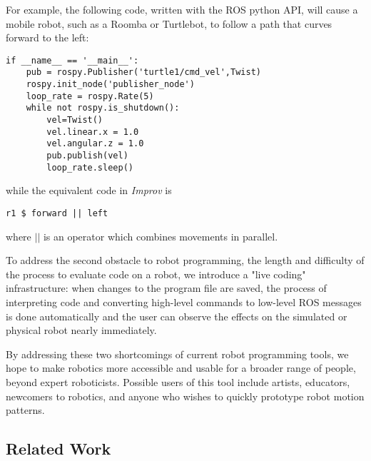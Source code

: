 \documentclass[sigconf]{acmart}
\begin{document}
For example, the following code, written with the ROS python API, will cause a
mobile robot, such as a Roomba or Turtlebot, to follow a path that curves
forward to the left:

\begin{verbatim}
if __name__ == '__main__':
    pub = rospy.Publisher('turtle1/cmd_vel',Twist)
    rospy.init_node('publisher_node')
    loop_rate = rospy.Rate(5)
    while not rospy.is_shutdown():
        vel=Twist()
        vel.linear.x = 1.0
        vel.angular.z = 1.0
        pub.publish(vel)
        loop_rate.sleep()
\end{verbatim}

while the equivalent code in \emph{Improv} is

\begin{verbatim}
r1 $ forward || left
\end{verbatim}

where $||$ is an operator which combines movements in parallel.

To address the second obstacle to robot programming, the length and difficulty
of the process to evaluate code on a robot, we introduce a "live coding"
infrastructure: when changes to the program file are saved, the process of
interpreting code and converting high-level commands to low-level ROS messages
is done automatically and the user can observe the effects on the simulated or
physical robot nearly immediately.

By addressing these two shortcomings of current robot programming tools, we hope
to make robotics more accessible and usable for a broader range of people,
beyond expert roboticists. Possible users of this tool include
artists, educators, newcomers to robotics, and anyone who wishes to quickly
prototype robot motion patterns.

\subsection{Related Work}
\end{document}
